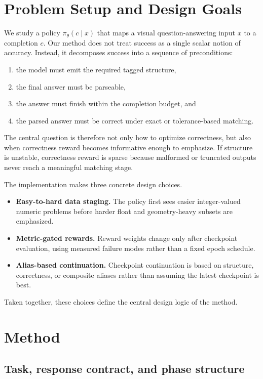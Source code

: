 \documentclass{article} %
\begin{document}
\section{Problem Setup and Design Goals}

We study a policy $\pi_\theta(c \mid x)$ that maps a visual question-answering input $x$ to a completion $c$. Our method does not treat success as a single scalar notion of accuracy. Instead, it decomposes success into a sequence of preconditions:
\begin{enumerate}[leftmargin=1.2em]
\item the model must emit the required tagged structure,
\item the final answer must be parseable,
\item the answer must finish within the completion budget, and
\item the parsed answer must be correct under exact or tolerance-based matching.
\end{enumerate}
The central question is therefore not only how to optimize correctness, but also when correctness reward becomes informative enough to emphasize. If structure is unstable, correctness reward is sparse because malformed or truncated outputs never reach a meaningful matching stage.

The implementation makes three concrete design choices.
\begin{itemize}[leftmargin=1.2em]
\item \textbf{Easy-to-hard data staging.} The policy first sees easier integer-valued numeric problems before harder float and geometry-heavy subsets are emphasized.
\item \textbf{Metric-gated rewards.} Reward weights change only after checkpoint evaluation, using measured failure modes rather than a fixed epoch schedule.
\item \textbf{Alias-based continuation.} Checkpoint continuation is based on structure, correctness, or composite aliases rather than assuming the latest checkpoint is best.
\end{itemize}
Taken together, these choices define the central design logic of the method.

\section{Method}

\subsection{Task, response contract, and phase structure}
\end{document}
